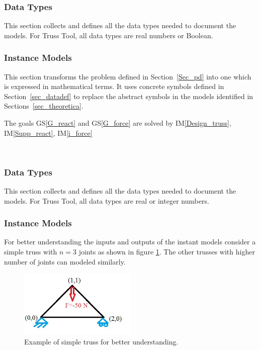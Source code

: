 \documentclass[12pt]{article}
\newcommand{\gsref}[1]{GS\ref{#1}}
\newcommand{\iref}[1]{IM\ref{#1}}
\begin{document}
\subsubsection{Data Types}\label{sec_datatypes}

This section collects and defines all the data types needed to document the models. For Truss Tool, all data types are real numbers or Boolean.

\subsubsection{Instance Models} \label{sec_instance}    

This section transforms the problem defined in Section~\ref{Sec_pd} into 
one which is expressed in mathematical terms. It uses concrete symbols defined 
in Section~\ref{sec_datadef} to replace the abstract symbols in the models 
identified in Sections~\ref{sec_theoretica}.

The goals \gsref{G_react} and \gsref{G_force} are solved by \iref{Design_truss}, \iref{Supp_react}, \iref{i_force}
 
~\newline

\subsubsection{Data Types}\label{sec_datatypes}

This section collects and defines all the data types needed to document the models. For Truss Tool, all data types are real or integer numbers.

\subsubsection{Instance Models} \label{sec_instance}    

For better understanding the inputs and outputs of the instant models consider a simple truss with $n=3$ joints as shown in figure \ref{fig_example}. The other trusses with higher number of joints can modeled similarly.
\begin{figure}[h!]
\begin{center}
 
  \includegraphics[width=0.5\textwidth]{example.jpg}
 
 \caption{Example of simple truss for better understanding.}
 \label{fig_example}
 \end{center}
 \end{figure}
\end{document}
